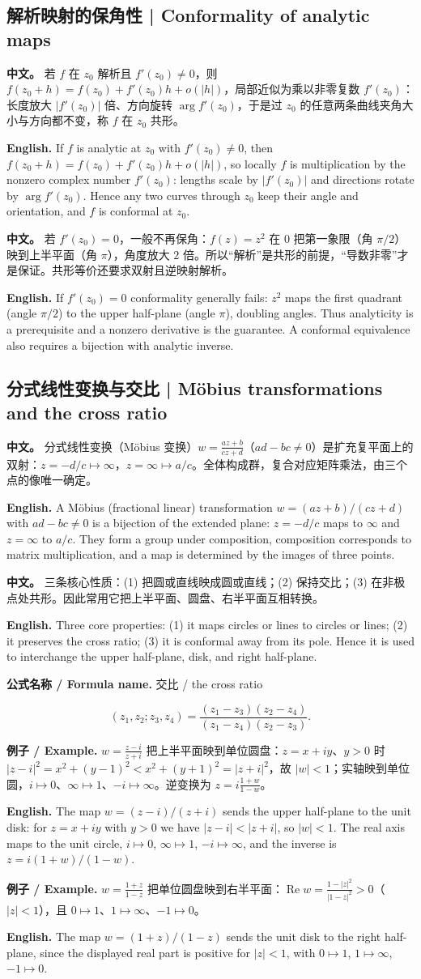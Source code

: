 \documentclass[UTF8,11pt,a4paper]{ctexart}
\newcommand{\EN}[1]{\par\noindent \textbf{English.} #1\par}
\newcommand{\FORMULA}[2]{\par\noindent\textbf{公式名称 / Formula name.} #1 / #2\par}
\newcommand{\EX}[2]{\par\noindent \textbf{例子 / Example.} #1\par\EN{#2}}
\newcommand{\APS}[2]{\par\noindent\textbf{中文。} #1\par\noindent\textbf{English.} #2\par\smallskip}
\begin{document}
\subsection{解析映射的保角性 | Conformality of analytic maps}
\APS{若 $f$ 在 $z_0$ 解析且 $f'(z_0)\ne0$，则 $f(z_0+h)=f(z_0)+f'(z_0)h+o(|h|)$，局部近似为乘以非零复数 $f'(z_0)$：长度放大 $|f'(z_0)|$ 倍、方向旋转 $\arg f'(z_0)$，于是过 $z_0$ 的任意两条曲线夹角大小与方向都不变，称 $f$ 在 $z_0$ 共形。}{If $f$ is analytic at $z_0$ with $f'(z_0)\ne0$, then $f(z_0+h)=f(z_0)+f'(z_0)h+o(|h|)$, so locally $f$ is multiplication by the nonzero complex number $f'(z_0)$: lengths scale by $|f'(z_0)|$ and directions rotate by $\arg f'(z_0)$. Hence any two curves through $z_0$ keep their angle and orientation, and $f$ is conformal at $z_0$.}
\APS{若 $f'(z_0)=0$，一般不再保角：$f(z)=z^2$ 在 $0$ 把第一象限（角 $\pi/2$）映到上半平面（角 $\pi$），角度放大 $2$ 倍。所以“解析”是共形的前提，“导数非零”才是保证。共形等价还要求双射且逆映射解析。}{If $f'(z_0)=0$ conformality generally fails: $z^2$ maps the first quadrant (angle $\pi/2$) to the upper half-plane (angle $\pi$), doubling angles. Thus analyticity is a prerequisite and a nonzero derivative is the guarantee. A conformal equivalence also requires a bijection with analytic inverse.}

\subsection{分式线性变换与交比 | Möbius transformations and the cross ratio}
\APS{分式线性变换（Möbius 变换）$w=\frac{az+b}{cz+d}$（$ad-bc\ne0$）是扩充复平面上的双射：$z=-d/c\mapsto\infty$，$z=\infty\mapsto a/c$。全体构成群，复合对应矩阵乘法，由三个点的像唯一确定。}{A Möbius (fractional linear) transformation $w=(az+b)/(cz+d)$ with $ad-bc\ne0$ is a bijection of the extended plane: $z=-d/c$ maps to $\infty$ and $z=\infty$ to $a/c$. They form a group under composition, composition corresponds to matrix multiplication, and a map is determined by the images of three points.}
\APS{三条核心性质：(1) 把圆或直线映成圆或直线；(2) 保持交比；(3) 在非极点处共形。因此常用它把上半平面、圆盘、右半平面互相转换。}{Three core properties: (1) it maps circles or lines to circles or lines; (2) it preserves the cross ratio; (3) it is conformal away from its pole. Hence it is used to interchange the upper half-plane, disk, and right half-plane.}
\FORMULA{交比}{the cross ratio}
\[
(z_1,z_2;z_3,z_4)=\frac{(z_1-z_3)(z_2-z_4)}{(z_1-z_4)(z_2-z_3)}.
\]
\EX{$w=\frac{z-i}{z+i}$ 把上半平面映到单位圆盘：$z=x+iy$、$y>0$ 时 $|z-i|^2=x^2+(y-1)^2<x^2+(y+1)^2=|z+i|^2$，故 $|w|<1$；实轴映到单位圆，$i\mapsto0$、$\infty\mapsto1$、$-i\mapsto\infty$。逆变换为 $z=i\frac{1+w}{1-w}$。}{The map $w=(z-i)/(z+i)$ sends the upper half-plane to the unit disk: for $z=x+iy$ with $y>0$ we have $|z-i|<|z+i|$, so $|w|<1$. The real axis maps to the unit circle, $i\mapsto0$, $\infty\mapsto1$, $-i\mapsto\infty$, and the inverse is $z=i(1+w)/(1-w)$.}
\EX{$w=\frac{1+z}{1-z}$ 把单位圆盘映到右半平面：$\operatorname{Re}w=\frac{1-|z|^2}{|1-z|^2}>0$（$|z|<1$），且 $0\mapsto1$、$1\mapsto\infty$、$-1\mapsto0$。}{The map $w=(1+z)/(1-z)$ sends the unit disk to the right half-plane, since the displayed real part is positive for $|z|<1$, with $0\mapsto1$, $1\mapsto\infty$, $-1\mapsto0$.}
\end{document}
